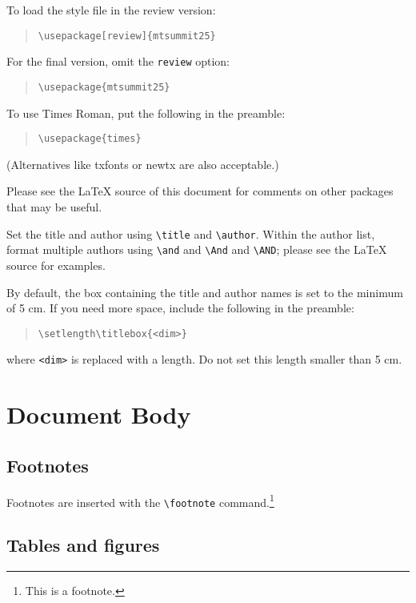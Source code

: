 \documentclass[11pt]{article}
\begin{document}
To load the style file in the review version:
\begin{quote}
\begin{verbatim}
\usepackage[review]{mtsummit25}
\end{verbatim}
\end{quote}
For the final version, omit the \verb|review| option:
\begin{quote}
\begin{verbatim}
\usepackage{mtsummit25}
\end{verbatim}
\end{quote}

To use Times Roman, put the following in the preamble:
\begin{quote}
\begin{verbatim}
\usepackage{times}
\end{verbatim}
\end{quote}
(Alternatives like txfonts or newtx are also acceptable.)

Please see the \LaTeX{} source of this document for comments on other packages that may be useful.

Set the title and author using \verb|\title| and \verb|\author|. Within the author list, format multiple authors using \verb|\and| and \verb|\And| and \verb|\AND|; please see the \LaTeX{} source for examples.

By default, the box containing the title and author names is set to the minimum of 5 cm. If you need more space, include the following in the preamble:
\begin{quote}
\begin{verbatim}
\setlength\titlebox{<dim>}
\end{verbatim}
\end{quote}
where \verb|<dim>| is replaced with a length. Do not set this length smaller than 5 cm.

\section{Document Body}

\subsection{Footnotes}

Footnotes are inserted with the \verb|\footnote| command.\footnote{This is a footnote.}

\subsection{Tables and figures}
\end{document}
